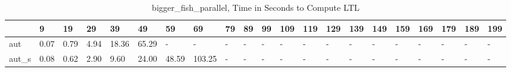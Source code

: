 \begin{table}
\centering
\caption{bigger_fish_parallel, Time in Seconds to Compute LTL}
\label{bigger_fish_parallel_LTL_time}
\begin{tabular}{lllllllllllllllllllll}
\toprule
{} &     9 &    19 &    29 &     39 &     49 &     59 &      69 & 79 & 89 & 99 & 109 & 119 & 129 & 139 & 149 & 159 & 169 & 179 & 189 & 199 \\
\midrule
aut   &  0.07 &  0.79 &  4.94 &  18.36 &  65.29 &      - &       - &  - &  - &  - &   - &   - &   - &   - &   - &   - &   - &   - &   - &   - \\
aut\_s &  0.08 &  0.62 &  2.90 &   9.60 &  24.00 &  48.59 &  103.25 &  - &  - &  - &   - &   - &   - &   - &   - &   - &   - &   - &   - &   - \\
\bottomrule
\end{tabular}
\end{table}
